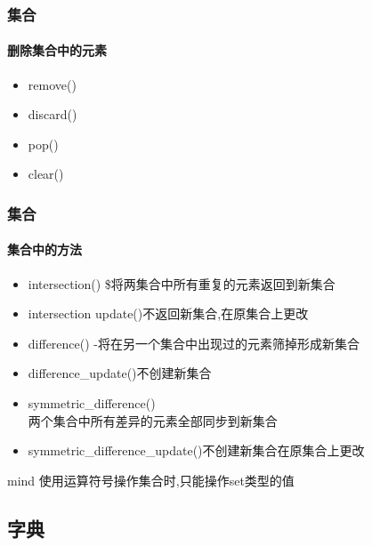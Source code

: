 \documentclass{beamer}
\begin{document}
\begin{frame}[t]
	\frametitle{集合}
	\framesubtitle{删除集合中的元素}
	\begin{itemize}
		\item remove()
		\item discard()
		\item pop()
		\item clear()
	\end{itemize}
\end{frame}
\begin{frame}[t]
	\frametitle{集合}
	\framesubtitle{集合中的方法}
	\begin{itemize}
		\item intersection() 	\$将两集合中所有重复的元素返回到新集合
		\item intersection	update()不返回新集合,在原集合上更改
		\item difference()	-将在另一个集合中出现过的元素筛掉形成新集合
		\item difference\_update()不创建新集合
		\item symmetric\_difference() \^	\\ 两个集合中所有差异的元素全部同步到新集合
		\item symmetric\_difference\_update()不创建新集合在原集合上更改

	\end{itemize}
	\begin{alertblock}{mind}
		使用运算符号操作集合时,只能操作set类型的值
	\end{alertblock}

\end{frame}

\subsection{字典}
\end{document}
